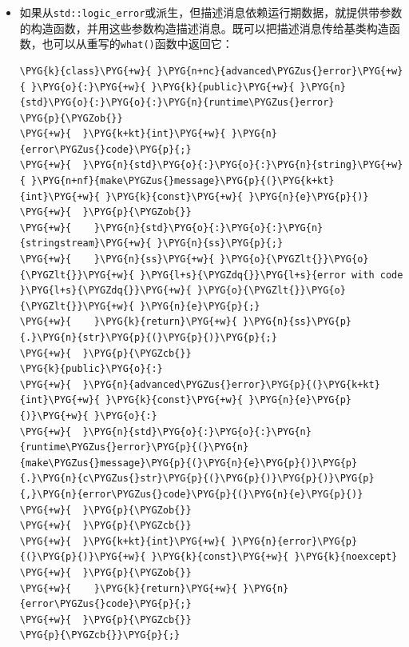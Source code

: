 \begin{itemize}

\item 如果从\texttt{std::\allowbreak{}logic\_\allowbreak{}error}或派生，但描述消息依赖运行期数据，就提供带参数的构造函数，并用这些参数构造描述消息。既可以把描述消息传给基类构造函数，也可以从重写的\texttt{what()}函数中返回它：



\begin{codeblockbg}
\begin{Verbatim}[commandchars=\\\{\},breaklines=true,breakanywhere=true,fontsize=\codefont,xleftmargin=17bp]
\PYG{k}{class}\PYG{+w}{ }\PYG{n+nc}{advanced\PYGZus{}error}\PYG{+w}{ }\PYG{o}{:}\PYG{+w}{ }\PYG{k}{public}\PYG{+w}{ }\PYG{n}{std}\PYG{o}{:}\PYG{o}{:}\PYG{n}{runtime\PYGZus{}error}
\PYG{p}{\PYGZob{}}
\PYG{+w}{  }\PYG{k+kt}{int}\PYG{+w}{ }\PYG{n}{error\PYGZus{}code}\PYG{p}{;}
\PYG{+w}{  }\PYG{n}{std}\PYG{o}{:}\PYG{o}{:}\PYG{n}{string}\PYG{+w}{ }\PYG{n+nf}{make\PYGZus{}message}\PYG{p}{(}\PYG{k+kt}{int}\PYG{+w}{ }\PYG{k}{const}\PYG{+w}{ }\PYG{n}{e}\PYG{p}{)}
\PYG{+w}{  }\PYG{p}{\PYGZob{}}
\PYG{+w}{    }\PYG{n}{std}\PYG{o}{:}\PYG{o}{:}\PYG{n}{stringstream}\PYG{+w}{ }\PYG{n}{ss}\PYG{p}{;}
\PYG{+w}{    }\PYG{n}{ss}\PYG{+w}{ }\PYG{o}{\PYGZlt{}}\PYG{o}{\PYGZlt{}}\PYG{+w}{ }\PYG{l+s}{\PYGZdq{}}\PYG{l+s}{error with code }\PYG{l+s}{\PYGZdq{}}\PYG{+w}{ }\PYG{o}{\PYGZlt{}}\PYG{o}{\PYGZlt{}}\PYG{+w}{ }\PYG{n}{e}\PYG{p}{;}
\PYG{+w}{    }\PYG{k}{return}\PYG{+w}{ }\PYG{n}{ss}\PYG{p}{.}\PYG{n}{str}\PYG{p}{(}\PYG{p}{)}\PYG{p}{;}
\PYG{+w}{  }\PYG{p}{\PYGZcb{}}
\PYG{k}{public}\PYG{o}{:}
\PYG{+w}{  }\PYG{n}{advanced\PYGZus{}error}\PYG{p}{(}\PYG{k+kt}{int}\PYG{+w}{ }\PYG{k}{const}\PYG{+w}{ }\PYG{n}{e}\PYG{p}{)}\PYG{+w}{ }\PYG{o}{:}
\PYG{+w}{  }\PYG{n}{std}\PYG{o}{:}\PYG{o}{:}\PYG{n}{runtime\PYGZus{}error}\PYG{p}{(}\PYG{n}{make\PYGZus{}message}\PYG{p}{(}\PYG{n}{e}\PYG{p}{)}\PYG{p}{.}\PYG{n}{c\PYGZus{}str}\PYG{p}{(}\PYG{p}{)}\PYG{p}{)}\PYG{p}{,}\PYG{n}{error\PYGZus{}code}\PYG{p}{(}\PYG{n}{e}\PYG{p}{)}
\PYG{+w}{  }\PYG{p}{\PYGZob{}}
\PYG{+w}{  }\PYG{p}{\PYGZcb{}}
\PYG{+w}{  }\PYG{k+kt}{int}\PYG{+w}{ }\PYG{n}{error}\PYG{p}{(}\PYG{p}{)}\PYG{+w}{ }\PYG{k}{const}\PYG{+w}{ }\PYG{k}{noexcept}
\PYG{+w}{  }\PYG{p}{\PYGZob{}}
\PYG{+w}{    }\PYG{k}{return}\PYG{+w}{ }\PYG{n}{error\PYGZus{}code}\PYG{p}{;}
\PYG{+w}{  }\PYG{p}{\PYGZcb{}}
\PYG{p}{\PYGZcb{}}\PYG{p}{;}
\end{Verbatim}
\end{codeblockbg}

\end{itemize}


